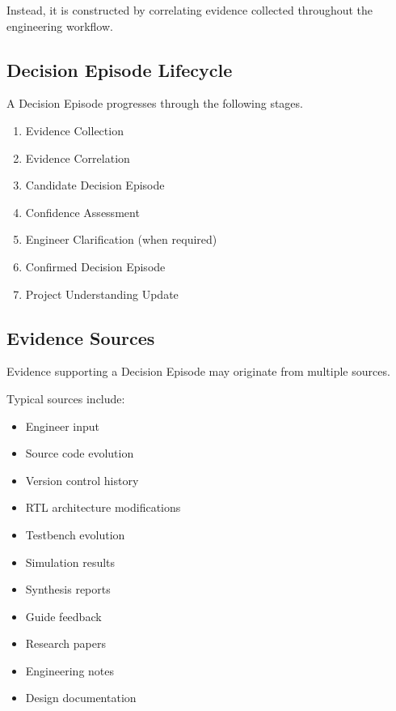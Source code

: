 Instead, it is constructed by correlating evidence collected throughout the engineering workflow.

\vspace{0.5cm}

\subsection{Decision Episode Lifecycle}

A Decision Episode progresses through the following stages.

\begin{enumerate}
    \item Evidence Collection
    \item Evidence Correlation
    \item Candidate Decision Episode
    \item Confidence Assessment
    \item Engineer Clarification (when required)
    \item Confirmed Decision Episode
    \item Project Understanding Update
\end{enumerate}

\vspace{0.5cm}

\subsection{Evidence Sources}

Evidence supporting a Decision Episode may originate from multiple sources.

Typical sources include:

\begin{itemize}
    \item Engineer input
    \item Source code evolution
    \item Version control history
    \item RTL architecture modifications
    \item Testbench evolution
    \item Simulation results
    \item Synthesis reports
    \item Guide feedback
    \item Research papers
    \item Engineering notes
    \item Design documentation
\end{itemize}

